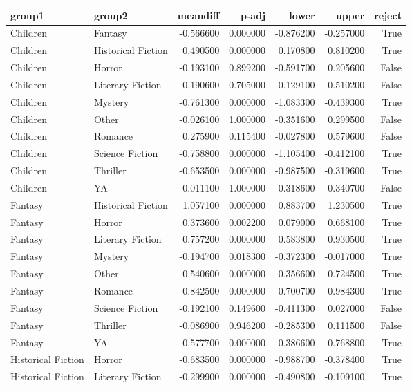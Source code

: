 \begin{tabular}{llrrrrr}
\toprule
group1 & group2 & meandiff & p-adj & lower & upper & reject \\
\midrule
Children & Fantasy & -0.566600 & 0.000000 & -0.876200 & -0.257000 & True \\
Children & Historical Fiction & 0.490500 & 0.000000 & 0.170800 & 0.810200 & True \\
Children & Horror & -0.193100 & 0.899200 & -0.591700 & 0.205600 & False \\
Children & Literary Fiction & 0.190600 & 0.705000 & -0.129100 & 0.510200 & False \\
Children & Mystery & -0.761300 & 0.000000 & -1.083300 & -0.439300 & True \\
Children & Other & -0.026100 & 1.000000 & -0.351600 & 0.299500 & False \\
Children & Romance & 0.275900 & 0.115400 & -0.027800 & 0.579600 & False \\
Children & Science Fiction & -0.758800 & 0.000000 & -1.105400 & -0.412100 & True \\
Children & Thriller & -0.653500 & 0.000000 & -0.987500 & -0.319600 & True \\
Children & YA & 0.011100 & 1.000000 & -0.318600 & 0.340700 & False \\
Fantasy & Historical Fiction & 1.057100 & 0.000000 & 0.883700 & 1.230500 & True \\
Fantasy & Horror & 0.373600 & 0.002200 & 0.079000 & 0.668100 & True \\
Fantasy & Literary Fiction & 0.757200 & 0.000000 & 0.583800 & 0.930500 & True \\
Fantasy & Mystery & -0.194700 & 0.018300 & -0.372300 & -0.017000 & True \\
Fantasy & Other & 0.540600 & 0.000000 & 0.356600 & 0.724500 & True \\
Fantasy & Romance & 0.842500 & 0.000000 & 0.700700 & 0.984300 & True \\
Fantasy & Science Fiction & -0.192100 & 0.149600 & -0.411300 & 0.027000 & False \\
Fantasy & Thriller & -0.086900 & 0.946200 & -0.285300 & 0.111500 & False \\
Fantasy & YA & 0.577700 & 0.000000 & 0.386600 & 0.768800 & True \\
Historical Fiction & Horror & -0.683500 & 0.000000 & -0.988700 & -0.378400 & True \\
Historical Fiction & Literary Fiction & -0.299900 & 0.000000 & -0.490800 & -0.109100 & True \\

\end{tabular}
